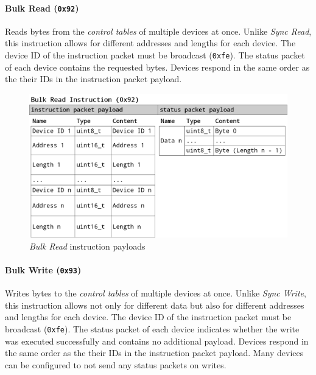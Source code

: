 \clearpage
\paragraph{Bulk Read (\lstinline{0x92})}

Reads bytes from the \textit{control tables} of multiple devices at once. Unlike \textit{Sync Read},
this instruction allows for different addresses and lengths for each device. The device ID of the
instruction packet must be broadcast (\lstinline{0xfe}). The status packet of each device contains
the requested bytes. Devices respond in the same order as the their IDs in the instruction packet
payload.

\begin{figure}[H]
    \centering
    \includegraphics[scale=0.2]{img/bulk_read_packet.png}
    \caption{\textit{Bulk Read} instruction payloads}
\end{figure}

\clearpage
\paragraph{Bulk Write (\lstinline{0x93})}

Writes bytes to the \textit{control tables} of multiple devices at once. Unlike \textit{Sync Write},
this instruction allows not only for different data but also for different addresses and lengths for
each device. The device ID of the instruction packet must be broadcast (\lstinline{0xfe}). The status
packet of each device indicates whether the write was executed successfully and contains no additional
payload. Devices respond in the same order as the their IDs in the instruction packet payload. Many
devices can be configured to not send any status packets on writes.

